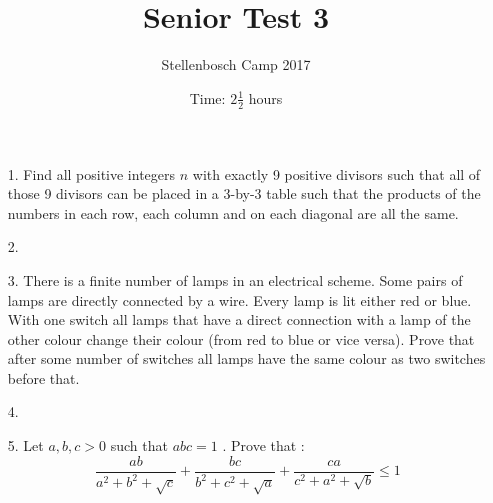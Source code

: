 \documentclass[12pt]{article}
\title{Senior Test 3}
\author{Stellenbosch Camp 2017}
\date{Time: $2\frac{1}{2}$ hours}
\begin{document}
 \maketitle

\begin{enumerate}

\item[1.] %
Find all positive integers $n$ with exactly 9 positive divisors such that all of those 9 divisors can be placed in a 3-by-3 table such that the products of the numbers in each row, each column and on each diagonal are all the same.


\item[2.] %


\item[3.] %
There is a finite number of lamps in an electrical scheme. Some pairs of lamps are directly connected by a wire. Every lamp is lit either red or blue. With one switch all lamps that have a direct connection with a lamp of the other colour change their colour (from red to blue or vice versa). Prove that after some number of switches all lamps have the same colour as two switches before that.


\item[4.] %


\item[5.] %
Let $ a,b,c > 0$ such that $ abc = 1$ . Prove that :
    $$ \frac {ab}{a^2 + b^2 + \sqrt {c}} + \frac {bc}{b^2 + c^2 + \sqrt {a}} + \frac {ca}{c^2 + a^2 + \sqrt {b}}\le 1 $$


\end{enumerate}
\end{document}
